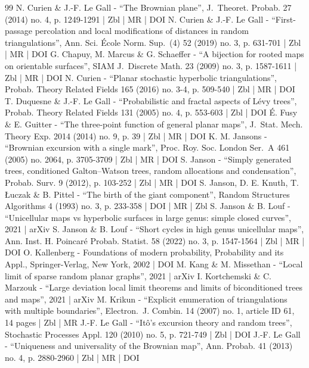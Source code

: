 \documentclass[10pt]{amsart}
\theoremstyle{plain}
\theoremstyle{definition}
\theoremstyle{remark}
\begin{document}
\begin{thebibliography}{99}
N. Curien \& J.-F. Le Gall - “The Brownian plane”, J. Theoret. Probab. 27 (2014) no. 4, p. 1249-1291 | Zbl | MR | DOI
N. Curien \& J.-F. Le Gall - “First-passage percolation and local modifications of distances in random triangulations”, Ann. Sci. École Norm. Sup. (4) 52 (2019) no. 3, p. 631-701 | Zbl | MR | DOI
G. Chapuy, M. Marcus \& G. Schaeffer - “A bijection for rooted maps on orientable surfaces”, SIAM J. Discrete Math. 23 (2009) no. 3, p. 1587-1611 | Zbl | MR | DOI
N. Curien - “Planar stochastic hyperbolic triangulations”, Probab. Theory Related Fields 165 (2016) no. 3-4, p. 509-540 | Zbl | MR | DOI
T. Duquesne \& J.-F. Le Gall - “Probabilistic and fractal aspects of Lévy trees”, Probab. Theory Related Fields 131 (2005) no. 4, p. 553-603 | Zbl | DOI
É. Fusy \& E. Guitter - “The three-point function of general planar maps”, J. Stat. Mech. Theory Exp. 2014 (2014) no. 9, p. 39 | Zbl | MR | DOI
K. M. Jansons - “Brownian excursion with a single mark”, Proc. Roy. Soc. London Ser. A 461 (2005) no. 2064, p. 3705-3709 | Zbl | MR | DOI
S. Janson - “Simply generated trees, conditioned Galton–Watson trees, random allocations and condensation”, Probab. Surv. 9 (2012), p. 103-252 | Zbl | MR | DOI
S. Janson, D. E. Knuth, T. Łuczak \& B. Pittel - “The birth of the giant component”, Random Structures Algorithms 4 (1993) no. 3, p. 233-358 | DOI | MR | Zbl
S. Janson \& B. Louf - “Unicellular maps vs hyperbolic surfaces in large genus: simple closed curves”, 2021 | arXiv
S. Janson \& B. Louf - “Short cycles in high genus unicellular maps”, Ann. Inst. H. Poincaré Probab. Statist. 58 (2022) no. 3, p. 1547-1564 | Zbl | MR | DOI
O. Kallenberg - Foundations of modern probability, Probability and its Appl., Springer-Verlag, New York, 2002 | DOI
M. Kang \& M. Missethan - “Local limit of sparse random planar graphs”, 2021 | arXiv
I. Kortchemski \& C. Marzouk - “Large deviation local limit theorems and limits of biconditioned trees and maps”, 2021 | arXiv
M. Krikun - “Explicit enumeration of triangulations with multiple boundaries”, Electron. J. Combin. 14 (2007) no. 1, article ID 61, 14 pages | Zbl | MR
J.-F. Le Gall - “Itô’s excursion theory and random trees”, Stochastic Processes Appl. 120 (2010) no. 5, p. 721-749 | Zbl | DOI
J.-F. Le Gall - “Uniqueness and universality of the Brownian map”, Ann. Probab. 41 (2013) no. 4, p. 2880-2960 | Zbl | MR | DOI

\end{thebibliography}
\end{document}
